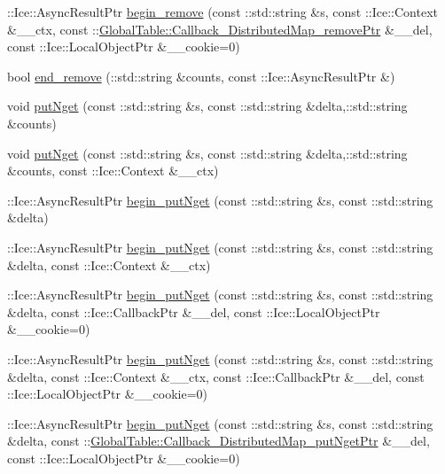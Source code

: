 \begin{DoxyCompactItemize}
\item 
::Ice::AsyncResultPtr \hyperlink{class_ice_proxy_1_1_global_table_1_1_distributed_map_af68e96e1483125167f8d6a0e962373bd}{begin\_\-remove} (const ::std::string \&s, const ::Ice::Context \&\_\-\_\-ctx, const ::\hyperlink{namespace_global_table_a38ad32022b6559c698996becbe357749}{GlobalTable::Callback\_\-DistributedMap\_\-removePtr} \&\_\-\_\-del, const ::Ice::LocalObjectPtr \&\_\-\_\-cookie=0)
\item 
bool \hyperlink{class_ice_proxy_1_1_global_table_1_1_distributed_map_a8875ce0c21f88fd62c59d40e5991f248}{end\_\-remove} (::std::string \&counts, const ::Ice::AsyncResultPtr \&)
\item 
void \hyperlink{class_ice_proxy_1_1_global_table_1_1_distributed_map_a2f7fd37f656e343b2562b0976203a040}{putNget} (const ::std::string \&s, const ::std::string \&delta,::std::string \&counts)
\item 
void \hyperlink{class_ice_proxy_1_1_global_table_1_1_distributed_map_a28fa9fb67cd94138e315b679da85a247}{putNget} (const ::std::string \&s, const ::std::string \&delta,::std::string \&counts, const ::Ice::Context \&\_\-\_\-ctx)
\item 
::Ice::AsyncResultPtr \hyperlink{class_ice_proxy_1_1_global_table_1_1_distributed_map_a2ce9fb426f365390f7b3befb0e77bdbb}{begin\_\-putNget} (const ::std::string \&s, const ::std::string \&delta)
\item 
::Ice::AsyncResultPtr \hyperlink{class_ice_proxy_1_1_global_table_1_1_distributed_map_a4f968779db74bb7b468f6e859cb1aed3}{begin\_\-putNget} (const ::std::string \&s, const ::std::string \&delta, const ::Ice::Context \&\_\-\_\-ctx)
\item 
::Ice::AsyncResultPtr \hyperlink{class_ice_proxy_1_1_global_table_1_1_distributed_map_ab85a6bb537235d32e07b372b0356c828}{begin\_\-putNget} (const ::std::string \&s, const ::std::string \&delta, const ::Ice::CallbackPtr \&\_\-\_\-del, const ::Ice::LocalObjectPtr \&\_\-\_\-cookie=0)
\item 
::Ice::AsyncResultPtr \hyperlink{class_ice_proxy_1_1_global_table_1_1_distributed_map_ac3143fd6a6c05e877f1e47ce77e2a327}{begin\_\-putNget} (const ::std::string \&s, const ::std::string \&delta, const ::Ice::Context \&\_\-\_\-ctx, const ::Ice::CallbackPtr \&\_\-\_\-del, const ::Ice::LocalObjectPtr \&\_\-\_\-cookie=0)
\item 
::Ice::AsyncResultPtr \hyperlink{class_ice_proxy_1_1_global_table_1_1_distributed_map_a303a4c51b86fce029f63e4e33a96df08}{begin\_\-putNget} (const ::std::string \&s, const ::std::string \&delta, const ::\hyperlink{namespace_global_table_afeefcdd5dfb862806549e834b8727011}{GlobalTable::Callback\_\-DistributedMap\_\-putNgetPtr} \&\_\-\_\-del, const ::Ice::LocalObjectPtr \&\_\-\_\-cookie=0)

\end{DoxyCompactItemize}
